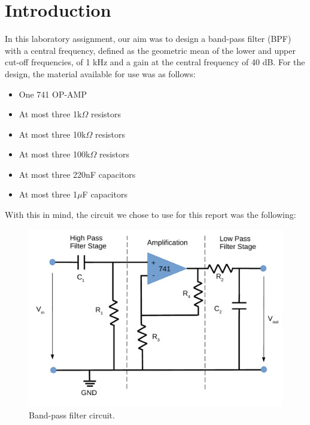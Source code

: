 \clearpage

\vspace{-0.25cm}
\section{Introduction}
\label{sec:introduction}

In this laboratory assignment, our aim was to design a band-pass filter (BPF)
with a central frequency, defined as the geometric mean of the lower and upper
cut-off frequencies, of 1 kHz and a gain at the central frequency of 40 dB.
For the design, the material available for use was as follows:

\begin{multicols}{2}
    \begin{itemize}
        \item One 741 OP-AMP
        \item At most three 1k$\Omega$ resistors
        \item At most three 10k$\Omega$ resistors
        \item At most three 100k$\Omega$ resistors
        \item At most three 220nF capacitors
        \item At most three 1$\mu$F capacitors
    \end{itemize}
\end{multicols}

With this in mind, the circuit we chose to use for this report was the following:
\begin{figure}[h] \centering
    \includegraphics[scale=0.65]{lab5_principal.pdf}
    \caption{Band-pass filter circuit.}
    \label{fig:Principal}
\end{figure}


